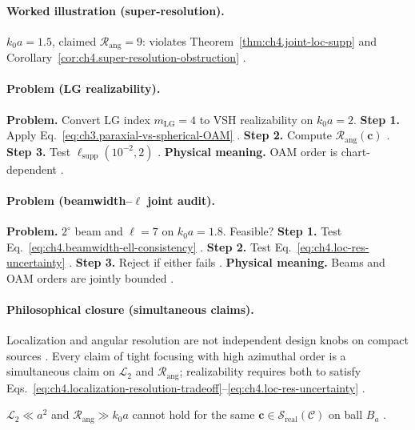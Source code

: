 \paragraph{Worked illustration (super-resolution).}
\(k_{0}a=1.5\), claimed \(\mathcal{R}_{\mathrm{ang}}=9\): violates Theorem~\ref{thm:ch4.joint-loc-supp} and Corollary~\ref{cor:ch4.super-resolution-obstruction}
\cite{hansen1988,jackson1999,harrington2001}.

\paragraph{Problem (LG realizability).}
\textbf{Problem.} Convert LG index \(m_{\mathrm{LG}}=4\) to VSH realizability on \(k_{0}a=2\).
\textbf{Step 1.} Apply Eq.~\eqref{eq:ch3.paraxial-vs-spherical-OAM} \cite{harrington2001}.
\textbf{Step 2.} Compute \(\mathcal{R}_{\mathrm{ang}}(\mathbf{c})\) \cite{hansen1988}.
\textbf{Step 3.} Test \(\ell_{\mathrm{supp}}(10^{-2},2)\) \cite{stratton1941,devaney2004}.
\textbf{Physical meaning.} OAM order is chart-dependent \cite{harrington2001}.

\paragraph{Problem (beamwidth--\(\ell\) joint audit).}
\textbf{Problem.} \(2^{\circ}\) beam and \(\ell=7\) on \(k_{0}a=1.8\). Feasible?
\textbf{Step 1.} Test Eq.~\eqref{eq:ch4.beamwidth-ell-consistency} \cite{hansen1988,jackson1999}.
\textbf{Step 2.} Test Eq.~\eqref{eq:ch4.loc-res-uncertainty} \cite{stratton1941,harrington2001}.
\textbf{Step 3.} Reject if either fails \cite{devaney2004}.
\textbf{Physical meaning.} Beams and OAM orders are jointly bounded \cite{hansen1988}.

\paragraph{Philosophical closure (simultaneous claims).}
Localization and angular resolution are not independent design knobs on compact sources \cite{hansen1988,stratton1941,harrington2001,jackson1999}.
Every claim of tight focusing with high azimuthal order is a simultaneous claim on \(\mathcal{L}_{2}\) and \(\mathcal{R}_{\mathrm{ang}}\); realizability
requires both to satisfy Eqs.~\eqref{eq:ch4.localization-resolution-tradeoff}--\eqref{eq:ch4.loc-res-uncertainty} \cite{devaney2004,hansen1988}.

\begin{corollary}
\label{cor:ch4.no-free-superres}
\(\mathcal{L}_{2}\ll a^{2}\) and \(\mathcal{R}_{\mathrm{ang}}\gg k_{0}a\) cannot hold for the same \(\mathbf{c}\in\mathcal{S}_{\mathrm{real}}(\mathcal{C})\) on ball \(B_{a}\)
\cite{hansen1988,stratton1941,devaney2004,harrington2001}.
\end{corollary}
